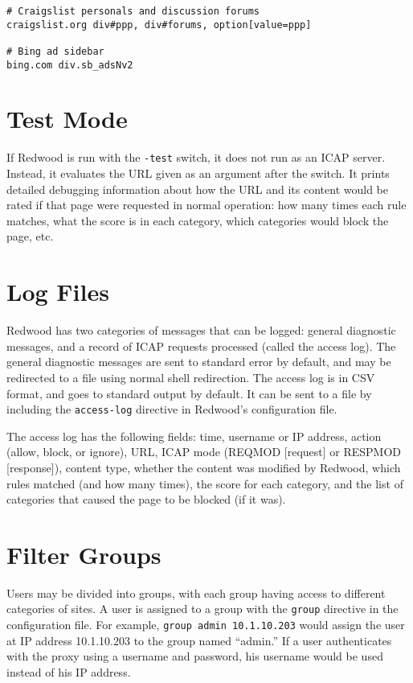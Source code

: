\documentclass{article}
\begin{document}
\begin{verbatim}
# Craigslist personals and discussion forums
craigslist.org div#ppp, div#forums, option[value=ppp]

# Bing ad sidebar
bing.com div.sb_adsNv2
\end{verbatim}

\section{Test Mode}

If Redwood is run with the \verb"-test" switch, it does not run as an ICAP server. 
Instead, it evaluates the URL given as an argument after the switch.
It prints detailed debugging information about how the URL and its content would be rated
if that page were requested in normal operation: how many times each rule matches, 
what the score is in each category, which categories would block the page, etc.

\section{Log Files}

Redwood has two categories of messages that can be logged:
general diagnostic messages, and a record of ICAP requests processed (called the access log).
The general diagnostic messages are sent to standard error by default,
and may be redirected to a file using normal shell redirection.
The access log is in CSV format, 
and goes to standard output by default.
It can be sent to a file by including the \verb"access-log" directive in Redwood's configuration file.

The access log has the following fields: time, username or IP address, 
action (allow, block, or ignore), URL, ICAP mode (REQMOD [request] or RESPMOD [response]), 
content type, whether the content was modified by Redwood, which rules matched (and how many times), 
the score for each category, and the list of categories that caused the page to be blocked (if it was).

\section{Filter Groups}

Users may be divided into groups, with each group having access to different categories of sites.
A user is assigned to a group with the \verb"group" directive in the configuration file.
For example, \verb"group admin 10.1.10.203" would assign the user at IP address 10.1.10.203
to the group named ``admin.'' 
If a user authenticates with the proxy using a username and password, 
his username would be used instead of his IP address.
\end{document}
